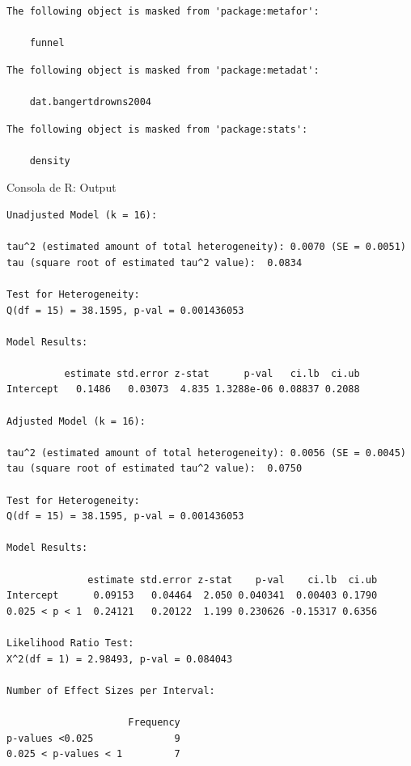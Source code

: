 \documentclass[
  bookmarksnumbered]{article}
\newenvironment{Shaded}{\begin{snugshade}}{\end{snugshade}}
\newcommand{\AttributeTok}[1]{\textcolor[rgb]{0.00,0.34,0.68}{#1}}
\newcommand{\ConstantTok}[1]{\textcolor[rgb]{0.67,0.33,0.00}{#1}}
\newcommand{\FunctionTok}[1]{\textcolor[rgb]{0.39,0.29,0.61}{#1}}
\newcommand{\NormalTok}[1]{\textcolor[rgb]{0.12,0.11,0.11}{#1}}
\newcommand{\OtherTok}[1]{\textcolor[rgb]{0.00,0.43,0.16}{#1}}
\newcommand{\SpecialCharTok}[1]{\textcolor[rgb]{0.24,0.68,0.91}{#1}}
\begin{document}
\begin{verbatim}
The following object is masked from 'package:metafor':

    funnel
\end{verbatim}

\begin{verbatim}
The following object is masked from 'package:metadat':

    dat.bangertdrowns2004
\end{verbatim}

\begin{verbatim}
The following object is masked from 'package:stats':

    density
\end{verbatim}

\begin{Shaded}
\end{Shaded}

\begin{ROut}{Consola de R: Output~\thetcbcounter}
                \begin{footnotesize}
                \begin{verbatim} 
Unadjusted Model (k = 16):

tau^2 (estimated amount of total heterogeneity): 0.0070 (SE = 0.0051)
tau (square root of estimated tau^2 value):  0.0834

Test for Heterogeneity:
Q(df = 15) = 38.1595, p-val = 0.001436053

Model Results:

          estimate std.error z-stat      p-val   ci.lb  ci.ub
Intercept   0.1486   0.03073  4.835 1.3288e-06 0.08837 0.2088

Adjusted Model (k = 16):

tau^2 (estimated amount of total heterogeneity): 0.0056 (SE = 0.0045)
tau (square root of estimated tau^2 value):  0.0750

Test for Heterogeneity:
Q(df = 15) = 38.1595, p-val = 0.001436053

Model Results:

              estimate std.error z-stat    p-val    ci.lb  ci.ub
Intercept      0.09153   0.04464  2.050 0.040341  0.00403 0.1790
0.025 < p < 1  0.24121   0.20122  1.199 0.230626 -0.15317 0.6356

Likelihood Ratio Test:
X^2(df = 1) = 2.98493, p-val = 0.084043

Number of Effect Sizes per Interval:

                     Frequency
p-values <0.025              9
0.025 < p-values < 1         7
 \end{verbatim}
                \end{footnotesize}
                \end{ROut}
\end{document}
